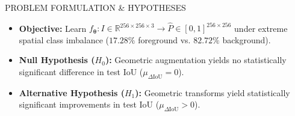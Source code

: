 \documentclass[10pt]{article}
\begin{document}
\begin{minipage}[t]{0.285\textwidth}
    \vspace{0.03in}

    \begin{bwcard}{PROBLEM FORMULATION \& HYPOTHESES}
    {\fontsize{7.2}{8.8}\selectfont
    \begin{itemize}\setlength{\itemsep}{1.5pt}\setlength{\leftmargin}{10pt}\setlength{\parskip}{0pt}
        \item \textbf{Objective:} Learn $f_{\bm{\theta}}: I \in \mathbb{R}^{256\times 256\times 3} \to \widehat{P} \in [0, 1]^{256\times 256}$ under extreme spatial class imbalance ($17.28\%$ foreground vs. $82.72\%$ background).
        \item \textbf{Null Hypothesis ($H_0$):} Geometric augmentation yields no statistically significant difference in test IoU ($\mu_{\Delta \text{IoU}} = 0$).
        \item \textbf{Alternative Hypothesis ($H_1$):} Geometric transforms yield statistically significant improvements in test IoU ($\mu_{\Delta \text{IoU}} > 0$).
    \end{itemize}
    }
    \end{bwcard}
\end{minipage}%
\hfill
\end{document}
